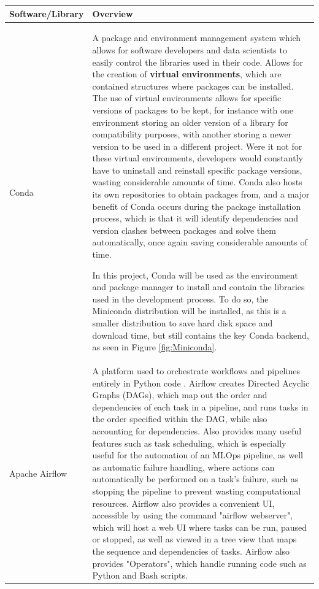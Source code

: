 \documentclass[12pt]{report}
\begin{document}
\begin{longtable}{ |p{}| p{}|}
    \hline
    \cellcolor{blue!25}Software/Library & \cellcolor{blue!25}Overview\\
    \hline
    Conda 
    & A package and environment management system which allows 
    for software developers and data scientists to easily control the libraries used in their code. Allows 
    for the creation of \textbf{virtual environments}, which are contained structures where packages can be installed.
    The use of virtual environments allows for specific versions of packages to be kept, for instance with one environment 
    storing an older version of a library for compatibility purposes, with another storing a newer version to be used in a different project. 
    Were it not for these virtual environments, developers would constantly have to uninstall and reinstall specific package versions, wasting 
    considerable amounts of time. Conda also hosts its own repositories to obtain packages from, and a 
    major benefit of Conda occurs during the package installation process, which is that it will identify 
    dependencies and version clashes between packages and solve them automatically, once again saving 
    considerable amounts of time.
    
    In this project, Conda will be used as the environment and package manager to install and contain the 
    libraries used in the development process. To do so, the Miniconda distribution will be installed, as 
    this is a smaller distribution to save hard disk space and download time, but still contains the key 
    Conda backend, as seen in Figure \ref{fig:Miniconda}. \\
    \hline
    Apache Airflow &
    A platform used to orchestrate workflows and pipelines entirely in Python code \autocite{apache_use_nodate}.
    Airflow creates Directed Acyclic Graphs (DAGs), which map out the order and dependencies of each task in a 
    pipeline, and runs tasks in the order specified within the DAG, while also accounting for dependencies.
    Also provides many useful features such as task scheduling, which is especially useful for the automation 
    of an MLOps pipeline, as well as automatic failure handling, where actions can automatically be performed 
    on a task's failure, such as stopping the pipeline to prevent wasting computational resources. Airflow 
    also provides a convenient UI, accessible by using the command "airflow webserver", which will host a 
    web UI where tasks can be run, paused or stopped, as well as viewed in a tree view that maps the 
    sequence and dependencies of tasks. Airflow also provides "Operators", which handle running code such 
    as Python and Bash scripts.


\end{longtable}
\end{document}
